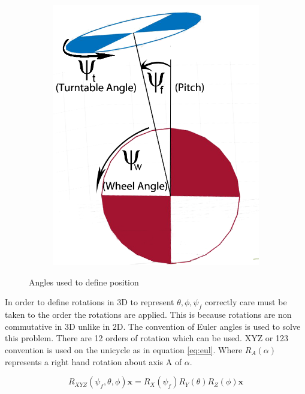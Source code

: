 \documentclass[twoside,twocolumn,12pt]{article}
\begin{document}
\begin{figure}[h]
\begin{subfigure}[t]{0.2295\textwidth}
    \includegraphics[width=\linewidth]{side_labled}
  \label{fig:s}
  \end{subfigure}
  \caption{Angles used to define position}
  \label{fig:ang}
\end{figure}

In order to define rotations in 3D to represent $\theta,\phi,\psi_f$ correctly care must be taken to the order the rotations are applied. This is because rotations are non commutative in 3D unlike in 2D. The convention of Euler angles is used to solve this problem. \cite{eric}
\newline
There are 12 orders of rotation which can be used. XYZ or 123 convention is used on the unicycle as in equation \ref{eq:eul}. Where $R_A(\alpha)$ represents a right hand rotation about axis A of $\alpha$. 

\begin{equation}
R_{XYZ}(\psi_f,\theta,\phi)\textbf{x} = R_X(\psi_f)R_Y(\theta)R_Z(\phi)\textbf{x}
\label{eq:eul}
\end{equation}
\end{document}
